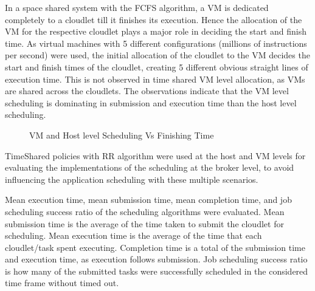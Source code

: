 \documentclass[times, 10pt,twocolumn]{article}
\begin{document}
In a space shared system with the FCFS algorithm, a VM is dedicated completely to a cloudlet till it finishes its execution. Hence the allocation of the VM for the respective cloudlet plays a major role in deciding the start and finish time. As virtual machines with 5 different configurations (millions of instructions per second) were used, the initial allocation of the cloudlet to the VM decides the start and finish times of the cloudlet, creating 5 different obvious straight lines of execution time. This is not observed in time shared VM level allocation, as VMs are shared across the cloudlets. The observations indicate that the VM level scheduling is dominating in submission and execution time than the host level scheduling.
\begin{figure}[ht]
 \caption{VM and Host level Scheduling Vs Finishing Time}
 \label{fig:finish}
\end{figure}

TimeShared policies with RR algorithm were used at the host and VM levels for evaluating the implementations of the scheduling at the broker level, to avoid influencing the application scheduling with these multiple scenarios.

Mean execution time, mean submission time, mean completion time, and job scheduling success ratio of the scheduling algorithms were evaluated. Mean submission time is the average of the time taken to submit the cloudlet for scheduling. Mean execution time is the average of the time that each cloudlet/task spent executing. Completion time is a total of the submission time and execution time, as execution follows submission. Job scheduling success ratio is how many of the submitted tasks were successfully scheduled in the considered time frame without timed out.
\end{document}
